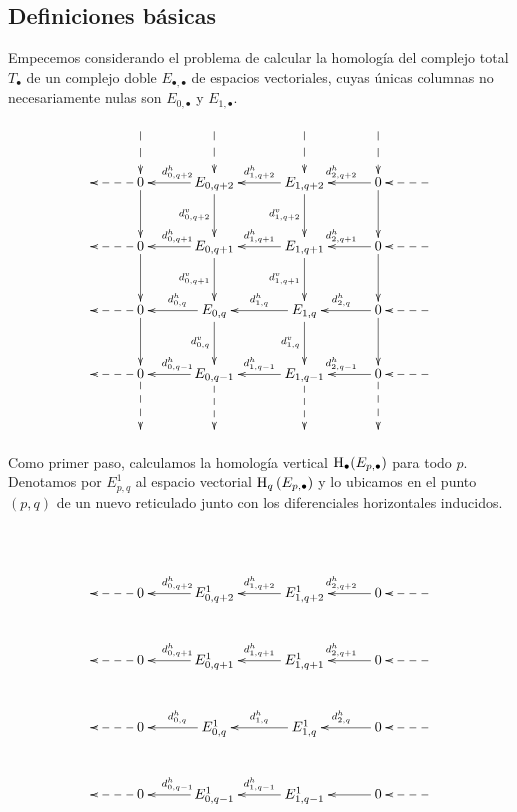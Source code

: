 \documentclass[a4paper,oneside,fleqn,11pt,../tesis.tex]{subfiles}
\begin{document}
\subsection{Definiciones básicas}
Empecemos considerando el problema de calcular la homología del complejo total $T_{\bullet}$ de un complejo doble
$E_{\bullet, \bullet}$ de espacios vectoriales, cuyas únicas columnas no necesariamente nulas son  $E_{0, \bullet}$ y $E_{1, \bullet}$.
\begin{align*}
    \xymatrix@=3em{
        &\ar@{-->}[d]& \ar@{-->}[d]& \ar@{-->}[d]& \ar@{-->}[d]& \\
        & 0 \ar@{-->}[l] \ar[d]& E_{0, q + 2} \ar[l]_{d^{h}_{0, q + 2}} \ar[d]_{d^{v}_{0, q + 2}}
            & E_{1,q + 2} \ar[l]_{d^{h}_{1, q + 2}} \ar[d]_{d^{v}_{1, q + 2}} & 0 \ar[l]_{d^{h}_{2, q + 2}} \ar[d] & \ar@{-->}[l]\\
        & 0 \ar@{-->}[l] \ar[d]& E_{0, q + 1} \ar[l]_{d^{h}_{0, q + 1}} \ar[d]_{d^{v}_{0, q + 1}}
            & E_{1,q + 1} \ar[l]_{d^{h}_{1, q + 1}} \ar[d]_{d^{v}_{1, q + 1}} & 0 \ar[l]_{d^{h}_{2, q + 1}} \ar[d]& \ar@{-->}[l]\\
        & 0 \ar@{-->}[l] \ar[d]& E_{0, q} \ar[l]_{d^{h}_{0, q}} \ar[d]_{d^{v}_{0, q}}
            & E_{1,q} \ar[l]_{d^{h}_{1, q}} \ar[d]_{d^{v}_{1, q}} & 0 \ar[l]_{d^{h}_{2, q}} \ar[d] &\ar@{-->}[l]\\
        & 0  \ar@{-->}[l] \ar@{-->}[d] & E_{0, q - 1} \ar[l]_{d^{h}_{0, q - 1}} \ar@{-->}[d]
            & E_{1, q- 1} \ar[l]_{d^{h}_{1 , q -1}} \ar@{-->}[d] & 0 \ar[l]_{d^{h}_{2, q - 1}} \ar@{-->}[d] &  \ar@{-->}[l]\\
        &&&&&
    }
\end{align*}

Como primer paso, calculamos la homología vertical $\operatorname{H}_{\bullet}(E_{p, \bullet})$ para todo $p$. Denotamos por $E_{p, q}^{1}$
al espacio vectorial $\operatorname{H}_{q}\left(E_{p, \bullet}\right)$ y lo ubicamos en el punto $(p, q)$  de un nuevo reticulado junto con los diferenciales horizontales inducidos. 

\begin{align*}
    \xymatrix@=3em{
        && & & & \\
        & 0 \ar@{-->}[l] & E^1_{0, q + 2} \ar[l]_{d^{h}_{0, q + 2}}
            & E^1_{1,q + 2} \ar[l]_{d^{h}_{1, q + 2}} & 0 \ar[l]_{d^{h}_{2, q + 2}}  & \ar@{-->}[l]\\
        & 0 \ar@{-->}[l] & E^1_{0, q + 1} \ar[l]_{d^{h}_{0, q + 1}} 
            & E^1_{1,q + 1} \ar[l]_{d^{h}_{1, q + 1}} & 0 \ar[l]_{d^{h}_{2, q + 1}} & \ar@{-->}[l]\\
        & 0 \ar@{-->}[l] & E^1_{0, q} \ar[l]_{d^{h}_{0, q}} 
            & E^1_{1,q} \ar[l]_{d^{h}_{1, q}}  & 0 \ar[l]_{d^{h}_{2, q}}  &\ar@{-->}[l]\\
        & 0  \ar@{-->}[l]  & E^{1}_{0, q - 1} \ar[l]_{d^{h}_{0, q - 1}}  & E^{1}_{1, q - 1} \ar[l]_{d^{h}_{1, q - 1}} & 0 \ar[l]  &  \ar@{-->}[l]\\
        &&&&&
    }
\end{align*}
\end{document}
